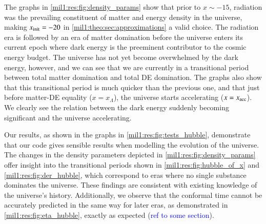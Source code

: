 
The graphs in \cref{mil1:res:fig:density_params} show that prior to $x\sim-15$, radiation was the prevailing constituent of matter and energy density in the universe, making $x_\mathrm{init}=-20$ in \cref{mil1:theo:sec:approximations} a valid choice. The radiation era is followed by an era of matter domination before the universe enters its current epoch where dark energy is the preeminent contributor to the cosmic energy budget. The universe has not yet become overwhelmed by the dark energy, however, and we can see that we are currently in a transitional period between total matter domination and total DE domination. The graphs also show that this transitional period is much quicker than the previous one, and that just before matter-DE equality ($x=x_{\Lambda}$), the universe starts accelerating ($x=x_\mathrm{acc}$). We clearly see the relation between the dark energy suddenly becoming significant and the universe accelerating. 

Our results, as shown in the graphs in \cref{mil1:res:fig:tests_hubble}, demonstrate that our code gives sensible results when modelling the evolution of the universe. The changes in the density parameters depicted in \cref{mil1:res:fig:density_params} offer insight into the transitional periods shown in \cref{mil1:res:fig:hubble_of_x} and \cref{mil1:res:fig:der_hubble}, which correspond to eras where no single substance dominates the universe. These findings are consistent with existing knowledge of the universe's history. Additionally, we observe that the conformal time cannot be accurately predicted in the same way for later eras, as demonstrated in \cref{mil1:res:fig:eta_hubble}, exactly as expected (\textcolor{blue}{ref to some section}).


